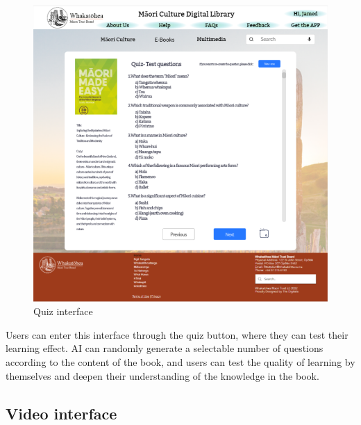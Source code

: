 \begin{figure}[htbp]
  \centerline{\includegraphics[width=400pt]{images/3-2-4.png}}
  \caption{Quiz interface}
  \label{fig30}
\end{figure}

Users can enter this interface through the quiz button, where they can test their learning effect. AI can randomly generate a selectable number of questions according to the content of the book, and users can test the quality of learning by themselves and deepen their understanding of the knowledge in the book.

\subsection{Video interface}

